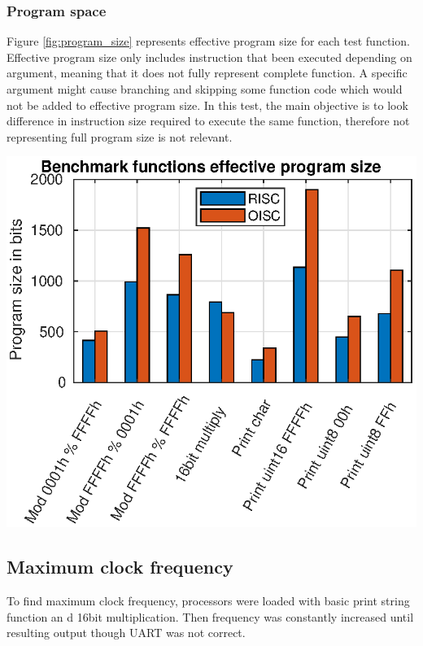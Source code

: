 \subsubsection{Program space}

Figure \ref{fig:program_size} represents effective program size for each test function. Effective program size only includes instruction that been executed depending on argument, meaning that it does not fully represent complete function. A specific argument might cause branching and skipping some function code which would not be added to effective program size. In this test, the main objective is to look difference in instruction size required to execute the same function, therefore not representing full program size is not relevant. 
\begin{colfigure}
	\centering
	\includegraphics[width=\linewidth]{../tests/program_size.eps}
	\label{fig:program_size}
\end{colfigure}




\subsection{Maximum clock frequency}
To find maximum clock frequency, processors were loaded with basic print string function an d 16bit multiplication. Then frequency was constantly increased until resulting output though UART was not correct. 

